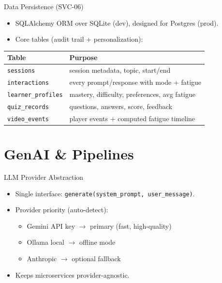 \documentclass{sdqbeamer}
\begin{document}
\begin{frame}{Data Persistence (SVC-06)}
\begin{itemize}
  \item SQLAlchemy ORM over SQLite (dev), designed for Postgres (prod).
  \item Core tables (audit trail + personalization):
\end{itemize}
\vspace{-1mm}
\small
\begin{tabularx}{\textwidth}{@{}l X@{}}
\toprule
\textbf{Table} & \textbf{Purpose}\\
\midrule
\texttt{sessions} & session metadata, topic, start/end\\
\texttt{interactions} & every prompt/response with mode + fatigue\\
\texttt{learner\_profiles} & mastery, difficulty, preferences, avg fatigue\\
\texttt{quiz\_records} & questions, answers, score, feedback\\
\texttt{video\_events} & player events + computed fatigue timeline\\
\bottomrule
\end{tabularx}
\end{frame}

\section{GenAI \& Pipelines}

\begin{frame}{LLM Provider Abstraction}
\begin{itemize}
  \item Single interface: \texttt{generate(system\_prompt, user\_message)}.
  \item Provider priority (auto-detect):
  \begin{itemize}
    \item Gemini API key $\rightarrow$ primary (fast, high-quality)
    \item Ollama local $\rightarrow$ offline mode
    \item Anthropic $\rightarrow$ optional fallback
  \end{itemize}
  \item Keeps microservices provider-agnostic.
\end{itemize}
\end{frame}
\end{document}
